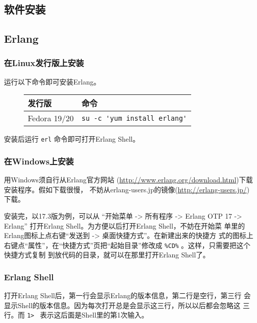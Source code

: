 \documentclass[preview,multi,crop=false,border=1in,class=memoir]{standalone}
\begin{document}
\begin{preview-page}

\section{软件安装}

\subsection{Erlang}

\subsubsection{在Linux发行版上安装}

运行以下命令即可安装Erlang。

\begin{figure}[hbt]
\centering
\begin{tabular}{|l|l|}
\hline
发行版 & 命令 \\
\hline
Fedora 19/20 & \verb|su -c 'yum install erlang'| \\
\hline
\end{tabular}
\end{figure}

安装后运行 \verb|erl| 命令即可打开Erlang Shell。

\subsubsection{在Windows上安装}

用Windows须自行从Erlang官方网站
(\url{http://www.erlang.org/download.html})下载安装程序。假如下载很慢，
不妨从erlang-users.jp的镜像(\url{http://erlang-users.jp/})下载。

\nonzeroparskip

安装完，以17.3版为例，可以从 ``开始菜单 -> 所有程序 -> Erlang OTP 17
-> Erlang'' 打开Erlang Shell。为方便以后打开Erlang Shell，不妨在开始菜
单里的Erlang图标上点右键``发送到 -> 桌面快捷方式''。在新建出来的快捷方
式的图标上右键点``属性''，在``快捷方式''页把``起始目录''修改成
\verb|%CD%| 。这样，只需要把这个快捷方式复制
到放代码的目录，就可以在那里打开Erlang Shell了。


\subsubsection{Erlang Shell}

打开Erlang Shell后，第一行会显示Erlang的版本信息，第二行是空行，第三行
会显示Shell的版本信息。因为每次打开总是会显示这三行，所以以后都会忽略这
三行。而 \verb|1> | 表示这后面是Shell里的第1次输入。


\end{preview-page}
\end{document}
